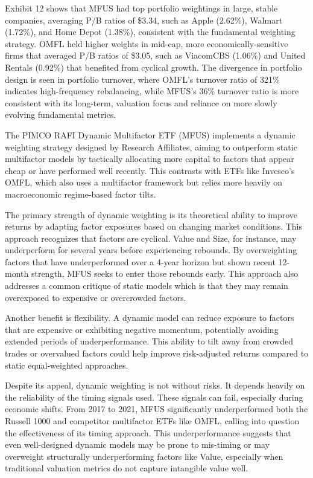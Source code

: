 \documentclass[
  letterpaper,
  DIV=11,
  numbers=noendperiod]{scrartcl}
\begin{document}
Exhibit 12 shows that MFUS had top portfolio weightings in large, stable
companies, averaging P/B ratios of \$3.34, such as Apple (2.62\%),
Walmart (1.72\%), and Home Depot (1.38\%), consistent with the
fundamental weighting strategy. OMFL held higher weights in mid-cap,
more economically-sensitive firms that averaged P/B ratios of \$3.05,
such as ViacomCBS (1.06\%) and United Rentals (0.92\%) that benefited
from cyclical growth. The divergence in portfolio design is seen in
portfolio turnover, where OMFL's turnover ratio of 321\% indicates
high-frequency rebalancing, while MFUS's 36\% turnover ratio is more
consistent with its long-term, valuation focus and reliance on more
slowly evolving fundamental metrics.

The PIMCO RAFI Dynamic Multifactor ETF (MFUS) implements a dynamic
weighting strategy designed by Research Affiliates, aiming to outperform
static multifactor models by tactically allocating more capital to
factors that appear cheap or have performed well recently. This
contrasts with ETFs like Invesco's OMFL, which also uses a multifactor
framework but relies more heavily on macroeconomic regime-based factor
tilts.

The primary strength of dynamic weighting is its theoretical ability to
improve returns by adapting factor exposures based on changing market
conditions. This approach recognizes that factors are cyclical. Value
and Size, for instance, may underperform for several years before
experiencing rebounds. By overweighting factors that have underperformed
over a 4-year horizon but shown recent 12-month strength, MFUS seeks to
enter those rebounds early. This approach also addresses a common
critique of static models which is that they may remain overexposed to
expensive or overcrowded factors.

Another benefit is flexibility. A dynamic model can reduce exposure to
factors that are expensive or exhibiting negative momentum, potentially
avoiding extended periods of underperformance. This ability to tilt away
from crowded trades or overvalued factors could help improve
risk-adjusted returns compared to static equal-weighted approaches.

Despite its appeal, dynamic weighting is not without risks. It depends
heavily on the reliability of the timing signals used. These signals can
fail, especially during economic shifts. From 2017 to 2021, MFUS
significantly underperformed both the Russell 1000 and competitor
multifactor ETFs like OMFL, calling into question the effectiveness of
its timing approach. This underperformance suggests that even
well-designed dynamic models may be prone to mis-timing or may
overweight structurally underperforming factors like Value, especially
when traditional valuation metrics do not capture intangible value well.
\end{document}

